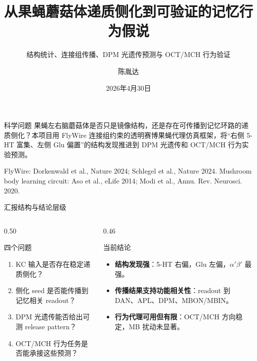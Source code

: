 \documentclass[aspectratio=169,10pt,fontset=none]{ctexbeamer}
\title[赛博果蝇组会汇报]{从果蝇蘑菇体递质侧化到可验证的记忆行为假说}
\subtitle{结构统计、连接组传播、DPM 光遗传预测与 OCT/MCH 行为验证}
\author{陈胤达}
\institute{\url{/unify/ydchen/unidit/bio_fly}}
\date{2026年4月30日}
\newcommand{\orange}[1]{\textcolor{FlyOrange}{\textbf{#1}}}
\newcommand{\refs}[1]{\vfill{\tiny\textcolor{FlyDark}{#1}}}
\begin{document}
\begin{frame}
  \titlepage
  \vspace{-0.6em}
\begin{block}{科学问题}
    果蝇左右脑蘑菇体是否只是镜像结构，还是存在可传播到记忆环路的递质侧化？本项目用 FlyWire 连接组约束的透明赛博果蝇代理仿真框架，将“右侧 5-HT 富集、左侧 Glu 偏置”的结构发现推进到 DPM 光遗传和 OCT/MCH 行为实验预测。
  \end{block}
  \refs{FlyWire: Dorkenwald et al., Nature 2024; Schlegel et al., Nature 2024. Mushroom body learning circuit: Aso et al., eLife 2014; Modi et al., Annu. Rev. Neurosci. 2020.}
\end{frame}

\begin{frame}{汇报结构与结论层级}
\small
\begin{columns}[T,onlytextwidth]
  \begin{column}{0.50\textwidth}
    \begin{block}{四个问题}
      \begin{enumerate}
        \item KC 输入是否存在稳定递质侧化？
        \item 侧化 seed 是否能传播到记忆相关 readout？
        \item DPM 光遗传能否给出可测 release pattern？
        \item OCT/MCH 行为任务是否能承接这些预测？
      \end{enumerate}
    \end{block}
  \end{column}
  \begin{column}{0.46\textwidth}
    \begin{block}{当前结论}
      \begin{itemize}
        \item \orange{结构发现强}：5-HT 右偏，Glu 左偏，$\alpha'\beta'$ 最强。
        \item \orange{传播结果支持功能相关性}：readout 到 DAN、APL、DPM、MBON/MBIN。
        \item \orange{行为代理可用但有限}：OCT/MCH 方向稳定，MB 扰动未显著。
      \end{itemize}
    \end{block}
  \end{column}
\end{columns}
\end{frame}
\end{document}
